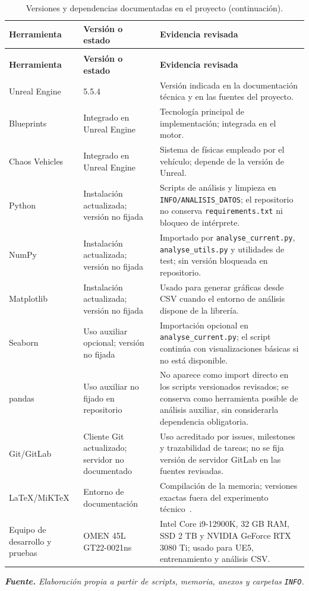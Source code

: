 {\footnotesize
\setlength{\tabcolsep}{3pt}
\renewcommand{\arraystretch}{0.92}
\begin{longtable}{L{2.75cm}L{2.7cm}>{\raggedright\arraybackslash}p{8.3cm}}
\caption{Versiones y dependencias documentadas en el proyecto.}%
\label{tab:versiones-herramientas}\\
\toprule
\textbf{Herramienta} & \textbf{Versión o estado} & \textbf{Evidencia revisada}\\
\midrule
\endfirsthead
\caption[]{Versiones y dependencias documentadas en el proyecto (continuación).}\\
\toprule
\textbf{Herramienta} & \textbf{Versión o estado} & \textbf{Evidencia revisada}\\
\midrule
\endhead
\bottomrule
\endfoot
\bottomrule
\endlastfoot
Unreal Engine & 5.5.4 & Versión indicada en la documentación técnica y en las fuentes del proyecto.\\
Blueprints & Integrado en Unreal Engine & Tecnología principal de implementación; integrada en el motor.\\
Chaos Vehicles & Integrado en Unreal Engine & Sistema de físicas empleado por el vehículo; depende de la versión de Unreal.\\
Python & Instalación actualizada; versión no fijada & Scripts de análisis y limpieza en \texttt{INFO/ANALISIS\_DATOS}; el repositorio no conserva \texttt{requirements.txt} ni bloqueo de intérprete.\\
NumPy & Instalación actualizada; versión no fijada & Importado por \texttt{analyse\_current.py}, \texttt{analyse\_utils.py} y utilidades de test; sin versión bloqueada en repositorio.\\
Matplotlib & Instalación actualizada; versión no fijada & Usado para generar gráficas desde CSV cuando el entorno de análisis dispone de la librería.\\
Seaborn & Uso auxiliar opcional; versión no fijada & Importación opcional en \texttt{analyse\_current.py}; el script continúa con visualizaciones básicas si no está disponible.\\
pandas & Uso auxiliar no fijado en repositorio & No aparece como import directo en los scripts versionados revisados; se conserva como herramienta posible de análisis auxiliar, sin considerarla dependencia obligatoria.\\
Git/GitLab & Cliente Git actualizado; servidor no documentado & Uso acreditado por issues, milestones y trazabilidad de tareas; no se fija versión de servidor GitLab en las fuentes revisadas.\\
LaTeX/MiKTeX & Entorno de documentación & Compilación de la memoria; versiones exactas fuera del experimento técnico~\cite{latex,miktex}.\\
Equipo de desarrollo y pruebas & OMEN 45L GT22-0021ns & Intel Core i9-12900K, 32 GB RAM, SSD 2 TB y NVIDIA GeForce RTX 3080 Ti; usado para UE5, entrenamiento y análisis CSV.\\
\end{longtable}
\begin{center}
\textit{\textbf{Fuente.} Elaboración propia a partir de scripts, memoria, anexos y carpetas \texttt{INFO}.}
\end{center}
}

